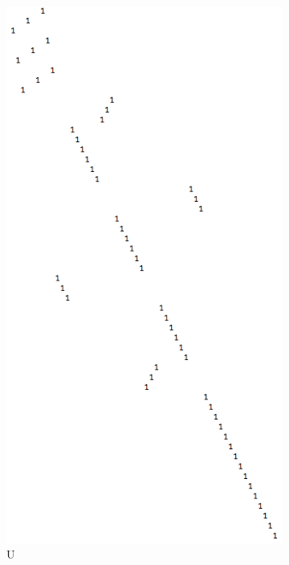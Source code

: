 \documentclass[11pt, oneside]{article}
\theoremstyle{plain}
\begin{document}
\begin{figure}[h!]
\begin{subfigure}[h]{0.4 \textwidth}
        \includegraphics[scale=0.30]{U}
        \caption{U}
    \end{subfigure}
    \hfill
    \begin{subfigure}[h]{0.4 \textwidth}

\end{subfigure}
\end{figure}
\end{document}
